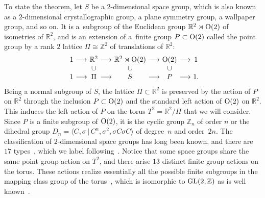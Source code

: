 \documentclass[pdftex]{sigma}
\theoremstyle{definition}
\newcommand{\R}{\mathbb{R}}
\newcommand{\Z}{\mathbb{Z}}
\begin{document}
To state the theorem, let $S$ be a $2$-dimensional space group, which is also known as a $2$-dimen\-sional crystallographic group, a plane symmetry group, a wallpaper group, and so on. It is a~subgroup of the Euclidean group $\R^2 \rtimes {\rm O}(2)$ of isometries of $\R^2$, and is an extension of a~f\/inite group $P \subset {\rm O}(2)$ called the point group by a rank $2$ lattice $\Pi \cong \Z^2$ of translations of $\R^2$:
\begin{gather*}
\begin{array}{c@{}c@{}c@{}c@{}c@{}c@{}c@{}c@{}c@{}c}
1 & \ \longrightarrow \ &
\R^2 & \ \longrightarrow \ &
\R^2 \rtimes {\rm O}(2) & \ \longrightarrow \ &
{\rm O}(2) & \ \longrightarrow \ &
1 \\
 & &
\cup & &
\cup & &
\cup & &
\\
1 & \ \longrightarrow \ &
\Pi & \ \longrightarrow \ &
S & \ \longrightarrow \ &
P & \ \longrightarrow \ &
1.
\end{array}
\end{gather*}
Being a normal subgroup of $S$, the lattice $\Pi \subset \R^2$ is preserved by the action of $P$ on $\R^2$ through the inclusion $P \subset {\rm O}(2)$ and the standard left action of ${\rm O}(2)$ on $\R^2$. This induces the left action of $P$ on the torus $T^2 = \R^2/\Pi$ that we will consider. Since $P$ is a f\/inite subgroup of ${\rm O}(2)$, it is the cyclic group $\Z_n$ of order $n$ or the dihedral group $D_n = \langle C, \sigma \,|\, C^n, \sigma^2, \sigma C \sigma C \rangle$ of degree~$n$ and order~$2n$. The classif\/ication of $2$-dimensional space groups has long been known, and there are $17$ types~\cite{H, Sch1}, which we label following~\cite{Shatt}. Notice that some space groups share the same point group action on $T^2$, and there arise $13$ distinct f\/inite group actions on the torus. These actions realize essentially all the possible f\/inite subgroups in the mapping class group of the torus~\cite{New}, which is isomorphic to ${\rm GL}(2, \Z)$ as is well known~\cite{Rol}.
\end{document}
